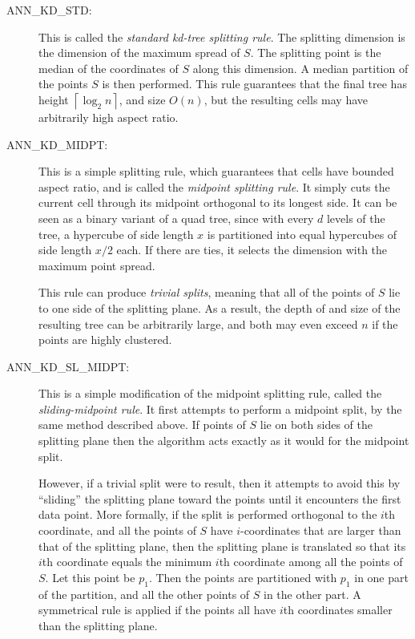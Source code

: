 \documentclass[11pt]{article}		%
\newcommand\ceil[1]{\left\lceil #1\right\rceil}
\begin{document}
\begin{description}
    
\item[\hbox{\sf ANN\_KD\_STD:}]
	This is called the \emph{standard kd-tree splitting rule}.
	The splitting dimension is the dimension of the maximum spread
	of $S$.  The splitting point is the median of the coordinates of $S$
	along this dimension.  A median partition of the points $S$ is
	then performed.  This rule guarantees that the final tree has height
	$\ceil{\log_2 n}$, and size $O(n)$, but the resulting cells may have
	arbitrarily high aspect ratio.

\item[\hbox{\sf ANN\_KD\_MIDPT:}]
	This is a simple splitting rule, which guarantees that cells have
	bounded aspect ratio, and is called the \emph{midpoint splitting
	rule}.  It simply cuts the current cell through its midpoint orthogonal
	to its longest side.  It can be seen as a binary variant of a quad tree,
	since with every $d$ levels of the tree, a hypercube of side length $x$
	is partitioned into equal hypercubes of side length $x/2$ each.  If
	there are ties, it selects the dimension with the maximum point spread.
	
	This rule can produce \emph{trivial splits}, meaning that all of the
	points of $S$ lie to one side of the splitting plane.  As a result, the
	depth of and size of the resulting tree can be arbitrarily large, and
	both may even exceed $n$ if the points are highly clustered.

\item[\hbox{\sf ANN\_KD\_SL\_MIDPT:}]
	This is a simple modification of the midpoint
	splitting rule, called the \emph{sliding-midpoint rule}.  It first
	attempts to perform a midpoint split, by the same method described
	above.  If points of $S$ lie on both sides of the splitting plane
	then the algorithm acts exactly as it would for the midpoint split.

	However, if a trivial split were to result, then it attempts to
	avoid this by ``sliding'' the splitting plane toward the points until
	it encounters the first data point.  More formally, if the split is
	performed orthogonal to the $i$th coordinate, and all the points of $S$
	have $i$-coordinates that are larger than that of the splitting plane,
	then the splitting plane is translated so that its $i$th coordinate
	equals the minimum $i$th coordinate among all the points of $S$.  Let
	this point be $p_1$.  Then the points are partitioned with $p_1$ in
	one part of the partition, and all the other points of $S$ in the other
	part.  A symmetrical rule is applied if the points all have $i$th
	coordinates smaller than the splitting plane.


\end{description}
\end{document}
